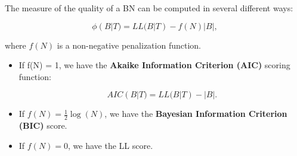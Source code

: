 The measure of the quality of a BN can be computed in several different ways:

$$\phi(B|T) = LL(B|T) - f(N)|B|,$$

where $f(N)$ is a non-negative penalization function.

\begin{itemize}
	\item If f(N) = 1, we have the \textbf{Akaike Information Criterion (AIC)} scoring function:
	
	$$AIC(B|T) = LL(B|T) - |B|.$$
	
	\item If $f(N) = \frac{1}{2} \log(N)$, we have the \textbf{Bayesian Information Criterion (BIC)} score.
	
	\item If $f(N) = 0$, we have the LL score.
\end{itemize}